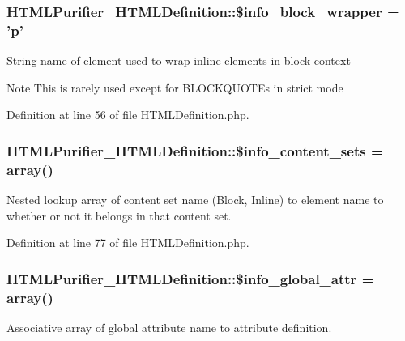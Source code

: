 \hypertarget{classHTMLPurifier__HTMLDefinition_a5cc22490461d0b4d669370a7c3d65de3}{
\subsubsection[{\$info\+\_\+block\+\_\+wrapper}]{\setlength{\rightskip}{0pt plus 5cm}H\+T\+M\+L\+Purifier\+\_\+\+H\+T\+M\+L\+Definition\+::\$info\+\_\+block\+\_\+wrapper = 'p'}}\label{classHTMLPurifier__HTMLDefinition_a5cc22490461d0b4d669370a7c3d65de3}
String name of element used to wrap inline elements in block context \begin{DoxyNote}{Note}
This is rarely used except for B\+L\+O\+C\+K\+Q\+U\+O\+T\+Es in strict mode 
\end{DoxyNote}


Definition at line 56 of file H\+T\+M\+L\+Definition.\+php.

\hypertarget{classHTMLPurifier__HTMLDefinition_a6b30c22edf1203d78746f119ba3292da}{
\subsubsection[{\$info\+\_\+content\+\_\+sets}]{\setlength{\rightskip}{0pt plus 5cm}H\+T\+M\+L\+Purifier\+\_\+\+H\+T\+M\+L\+Definition\+::\$info\+\_\+content\+\_\+sets = array()}}\label{classHTMLPurifier__HTMLDefinition_a6b30c22edf1203d78746f119ba3292da}
Nested lookup array of content set name (Block, Inline) to element name to whether or not it belongs in that content set. 

Definition at line 77 of file H\+T\+M\+L\+Definition.\+php.

\hypertarget{classHTMLPurifier__HTMLDefinition_ac0a6b529fd54bf3e94fb4f6ef1555a39}{
\subsubsection[{\$info\+\_\+global\+\_\+attr}]{\setlength{\rightskip}{0pt plus 5cm}H\+T\+M\+L\+Purifier\+\_\+\+H\+T\+M\+L\+Definition\+::\$info\+\_\+global\+\_\+attr = array()}}\label{classHTMLPurifier__HTMLDefinition_ac0a6b529fd54bf3e94fb4f6ef1555a39}
Associative array of global attribute name to attribute definition. 

